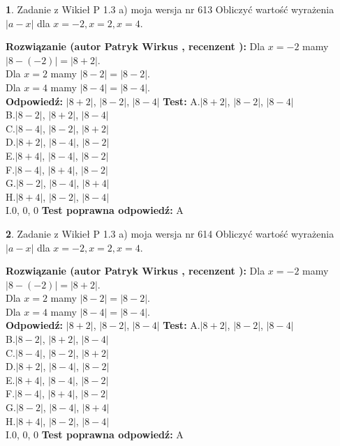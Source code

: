 \documentclass[12pt, a4paper]{article}
\theoremstyle{definition} %
\newtheorem{zad}{}
\newcommand{\zadStart}[1]{\begin{zad}#1\newline}
\newcommand{\zadStop}{\end{zad}}
\newcommand{\rozwStart}[2]{\noindent \textbf{Rozwiązanie (autor #1 , recenzent #2): }\newline}
\newcommand{\rozwStop}{\newline}
\newcommand{\odpStart}{\noindent \textbf{Odpowiedź:}\newline}
\newcommand{\odpStop}{\newline}
\newcommand{\testStart}{\noindent \textbf{Test:}\newline}
\newcommand{\testStop}{\newline}
\newcommand{\kluczStart}{\noindent \textbf{Test poprawna odpowiedź:}\newline}
\newcommand{\kluczStop}{\newline}
\begin{document}
\zadStart{Zadanie z Wikieł P 1.3 a) moja wersja nr 613}
Obliczyć wartość wyrażenia $|a - x|$ dla $x=-2,x=2,x=4$.
\zadStop
\rozwStart{Patryk Wirkus}{}
Dla $x = -2$ mamy $|8 - (-2)| = |8 + 2|$.\\
Dla $x = 2$ mamy $|8 - 2| = |8 - 2|$.\\
Dla $x = 4$ mamy $|8 - 4| = |8 - 4|$.\\
\rozwStop
\odpStart
$|8 + 2|$, $|8 - 2|$, $|8 - 4|$
\odpStop
\testStart
A.$|8 + 2|$, $|8 - 2|$, $|8 - 4|$\\
B.$|8 - 2|$, $|8 + 2|$, $|8 - 4|$\\
C.$|8 - 4|$, $|8 - 2|$, $|8 + 2|$\\
D.$|8 + 2|$, $|8 - 4|$, $|8 - 2|$\\
E.$|8 + 4|$, $|8 - 4|$, $|8 - 2|$\\
F.$|8 - 4|$, $|8 + 4|$, $|8 - 2|$\\
G.$|8 - 2|$, $|8 - 4|$, $|8 + 4|$\\
H.$|8 + 4|$, $|8 - 2|$, $|8 - 4|$\\
I.$0$, $0$, $0$
\testStop
\kluczStart
A
\kluczStop



\zadStart{Zadanie z Wikieł P 1.3 a) moja wersja nr 614}
Obliczyć wartość wyrażenia $|a - x|$ dla $x=-2,x=2,x=4$.
\zadStop
\rozwStart{Patryk Wirkus}{}
Dla $x = -2$ mamy $|8 - (-2)| = |8 + 2|$.\\
Dla $x = 2$ mamy $|8 - 2| = |8 - 2|$.\\
Dla $x = 4$ mamy $|8 - 4| = |8 - 4|$.\\
\rozwStop
\odpStart
$|8 + 2|$, $|8 - 2|$, $|8 - 4|$
\odpStop
\testStart
A.$|8 + 2|$, $|8 - 2|$, $|8 - 4|$\\
B.$|8 - 2|$, $|8 + 2|$, $|8 - 4|$\\
C.$|8 - 4|$, $|8 - 2|$, $|8 + 2|$\\
D.$|8 + 2|$, $|8 - 4|$, $|8 - 2|$\\
E.$|8 + 4|$, $|8 - 4|$, $|8 - 2|$\\
F.$|8 - 4|$, $|8 + 4|$, $|8 - 2|$\\
G.$|8 - 2|$, $|8 - 4|$, $|8 + 4|$\\
H.$|8 + 4|$, $|8 - 2|$, $|8 - 4|$\\
I.$0$, $0$, $0$
\testStop
\kluczStart
A
\kluczStop
\end{document}
